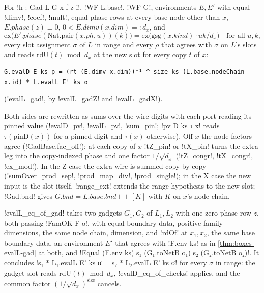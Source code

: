 {\begin{theorem}\label{thm:boxes-evalL-gad}
For \lbx!h : Gad L G x f z i!, \lbx!WF L.base!, \lbx!WF G!, environments $E,E'$ with equal \lbx!dimv!, \lbx!coef!, \lbx!mult!, equal phase rows at every base node other than $x$, $E.\mathit{phase}(z)\equiv 0$, $0<E.\mathit{dimv}(x.\mathit{dim})=:d_x$, and
\[
\mathrm{ex}\bigl(E'.\mathit{phase}(\mathrm{Nat.pair}(x.\mathit{ph},u))(k)\bigr)=\mathrm{ex}\bigl(\mathrm{gsg}(x.\mathit{kind})\cdot uk/d_x\bigr)\quad\text{for all }u,k,
\]
every slot assignment $\sigma$ of $L$ in range and every $\rho$ that agrees with $\sigma$ on $L$'s slots and reads $\mathrm{rdU}(t)\bmod d_x$ at the new slot for every copy $t$ of $x$:
\begin{lstlisting}[style=leanbox]
G.evalD E ks ρ = (rt (E.dimv x.dim))⁻¹ ^ size ks (L.base.nodeChain x.id) * L.evalL E' ks σ
\end{lstlisting}
(\lbx!evalL_gad!, by \lbx!evalL_gadZ! and \lbx!evalL_gadX!).
\end{theorem}
\noindent Both sides are rewritten as sums over the wire digits with each port reading its pinned value (\lbx!evalD_pv!, \lbx!evalL_pv!, \lbx!sum_pin!; \lbx!pv D ks τ x! reads $\tau(\mathrm{pinD}(x))$ for a pinned digit and $\tau(x)$ otherwise). Off $x$ the node factors agree (\lbx!GadBase.fac_off!); at each copy of $x$ \lbx!tZ_pin! or \lbx!tX_pin! turns the extra leg into the copy-indexed phase and one factor $1/\sqrt{d_x}$ (\lbx!tZ_congr!, \lbx!tX_congr!, \lbx!ex_mod!). In the Z case the extra wire is summed copy by copy (\lbx!sumOver_prod_sep!, \lbx!prod_map_div!, \lbx!prod_single!); in the X case the new input is the slot itself. \lbx!range_ext! extends the range hypothesis to the new slot; \lbx!Gad.bnd! gives $G.\mathit{bnd}=L.\mathit{base}.\mathit{bnd}\mathbin{+\!\!+}[K]$ with $K$ on $x$'s node chain.

\begin{theorem}\label{thm:boxes-evalL-eq-of-gad}
\lbx!evalL_eq_of_gad! takes two gadgets $G_1,G_2$ of $L_1,L_2$ with one zero phase row $z$, both passing \lbx!FamOK F o!, with equal boundary data, positive family dimensions, the same node chain, dimension, and \lbx!rdOf! at $x_1,x_2$, the same base boundary data, an environment $E'$ that agrees with \lbx!F.env ks! as in \cref{thm:boxes-evalL-gad} at both, and \lbx!Equal (F.env ks) s₁ (G₁.toNetB o₁) s₂ (G₂.toNetB o₂)!. It concludes \lbx!s₁ * L₁.evalL E' ks σ = s₂ * L₂.evalL E' ks σ! for every $\sigma$ in range: the gadget slot reads $\mathrm{rdU}(t)\bmod d_x$, \lbx!evalD_eq_of_checks! applies, and the common factor $(1/\sqrt{d_x})^{\mathrm{size}}$ cancels.
\end{theorem}

}
